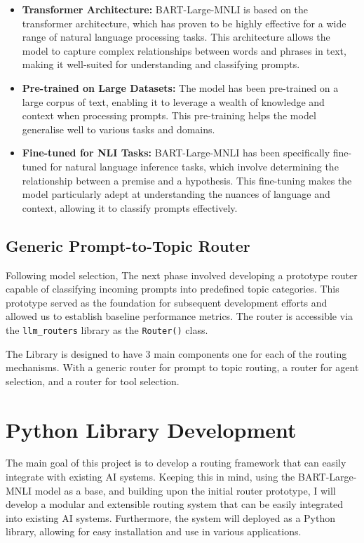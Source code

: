 \begin{itemize}
    \item \textbf{Transformer Architecture:} BART-Large-MNLI is based on the transformer architecture, which has proven to be highly effective for a wide range of natural language processing tasks. This architecture allows the model to capture complex relationships between words and phrases in text, making it well-suited for understanding and classifying prompts.
    \item \textbf{Pre-trained on Large Datasets:} The model has been pre-trained on a large corpus of text, enabling it to leverage a wealth of knowledge and context when processing prompts. This pre-training helps the model generalise well to various tasks and domains.
    \item \textbf{Fine-tuned for NLI Tasks:} BART-Large-MNLI has been specifically fine-tuned for natural language inference tasks, which involve determining the relationship between a premise and a hypothesis. This fine-tuning makes the model particularly adept at understanding the nuances of language and context, allowing it to classify prompts effectively.
\end{itemize}


\subsection{Generic Prompt-to-Topic Router}
\label{sec:generic_router_dev}
Following model selection, The next phase involved developing a prototype router capable of classifying incoming prompts into predefined topic categories. This prototype served as the foundation for subsequent development efforts and allowed us to establish baseline performance metrics. The router is accessible via the \texttt{llm\_routers} library as the \texttt{Router()} class.

The Library is designed to have 3 main components one for each of the routing mechanisms. With a generic router for prompt to topic routing, a router for agent selection, and a router for tool selection.

\section{Python Library Development}
\label{sec:router_dev}

The main goal of this project is to develop a routing framework that can easily integrate with existing AI systems. Keeping this in mind, using the BART-Large-MNLI model as a base, and building upon the initial router prototype, I will develop a modular and extensible routing system that can be easily integrated into existing AI systems. Furthermore, the system will deployed as a Python library, allowing for easy installation and use in various applications.

